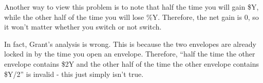 \documentclass{article}
\begin{document}
Another way to view this problem is to note that half the time you will gain \$Y, while the other half of the time you will lose \%Y. Therefore, the net gain is $0$, so it won't matter whether you switch or not switch.

In fact, Grant's analysis is wrong. This is because the two envelopes are already locked in by the time you open an envelope. Therefore, ``half the time the other envelope contains \$2Y and the other half of the time the other envelope contains \$Y/2'' is invalid - this just simply isn't true.

\newpage
\end{document}

